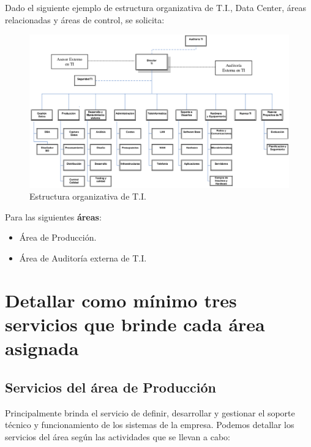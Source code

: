 

Dado el siguiente ejemplo de estructura organizativa de T.I., Data Center, áreas relacionadas y áreas de control, se solicita:

\begin{figure}[h]
  \centering
  \includegraphics[width=.85\textwidth]{img/tp2_integrador/organigrama}
  \caption{Estructura organizativa de T.I.}
  \label{organigrama-enunciado}
\end{figure}

Para las siguientes \textbf{áreas}:

\begin{itemize}
    \item Área de Producción.
    \item Área de Auditoría externa de T.I.
\end{itemize}


\newpage

	\section{Detallar como mínimo tres servicios que brinde cada área asignada}
    
    \subsection{Servicios del área de Producción}
    
    Principalmente brinda el servicio de definir, desarrollar y gestionar el soporte técnico y funcionamiento de los sistemas de la empresa. 
    Podemos detallar los servicios del área según las actividades que se llevan a cabo:
    

    
